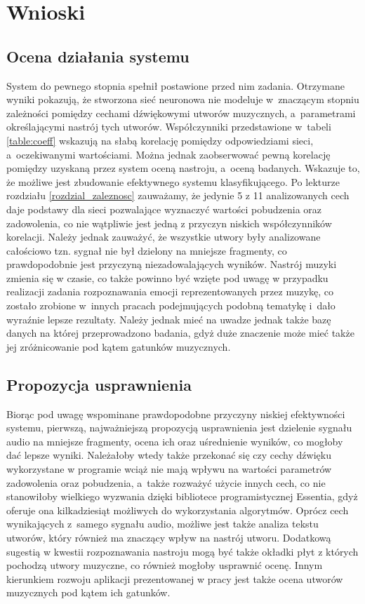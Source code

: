 \section{Wnioski}\label{rozdzial_wnioski}
\subsection{Ocena działania systemu}
System do pewnego stopnia spełnił postawione przed nim zadania. Otrzymane wyniki pokazują, że stworzona sieć neuronowa nie modeluje w~znaczącym stopniu zależności pomiędzy cechami dźwiękowymi utworów muzycznych, a~parametrami określającymi nastrój tych utworów. Współczynniki przedstawione w~tabeli \ref{table:coeff} wskazują na słabą korelację pomiędzy odpowiedziami sieci, a~oczekiwanymi wartościami. Można jednak zaobserwować pewną korelację pomiędzy uzyskaną przez system oceną nastroju, a~oceną badanych. Wskazuje to, że możliwe jest zbudowanie efektywnego systemu klasyfikującego. Po lekturze rozdziału \ref{rozdzial_zaleznosc} zauważamy, że jedynie 5 z 11 analizowanych cech daje podstawy dla sieci pozwalające wyznaczyć wartości pobudzenia oraz zadowolenia, co nie wątpliwie jest jedną z przyczyn niskich współczynników korelacji. Należy jednak zauważyć, że wszystkie utwory były analizowane całościowo tzn. sygnał nie był dzielony na mniejsze fragmenty, co prawdopodobnie jest przyczyną niezadowalających wyników. Nastrój muzyki zmienia się w czasie, co także powinno być wzięte pod uwagę w przypadku realizacji zadania rozpoznawania emocji reprezentowanych przez muzykę, co zostało zrobione w~innych pracach podejmujących podobną tematykę\cite{musicANN1}\cite{musicANN2} i~dało wyraźnie lepsze rezultaty. Należy jednak mieć na uwadze jednak także bazę danych na której przeprowadzono badania, gdyż duże znaczenie może mieć także jej zróżnicowanie pod kątem gatunków muzycznych. 
\subsection{Propozycja usprawnienia}
Biorąc pod uwagę wspominane prawdopodobne przyczyny niskiej efektywności systemu, pierwszą, najważniejszą propozycją usprawnienia jest dzielenie sygnału audio na mniejsze fragmenty, ocena ich oraz uśrednienie wyników, co mogłoby dać lepsze wyniki. Należałoby wtedy także przekonać się czy cechy dźwięku wykorzystane w programie wciąż nie mają wpływu na wartości parametrów zadowolenia oraz pobudzenia, a~także rozważyć użycie innych cech, co nie stanowiłoby wielkiego wyzwania dzięki bibliotece programistycznej Essentia, gdyż oferuje ona kilkadziesiąt możliwych do wykorzystania algorytmów. Oprócz cech wynikających z~samego sygnału audio, możliwe jest także analiza tekstu utworów, który również ma znaczący wpływ na nastrój utworu. Dodatkową sugestią w kwestii rozpoznawania nastroju mogą być także okładki płyt z których pochodzą utwory muzyczne, co również mogłoby usprawnić ocenę. Innym kierunkiem rozwoju aplikacji prezentowanej w pracy jest także ocena utworów muzycznych pod kątem ich gatunków.